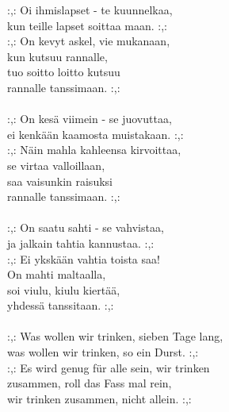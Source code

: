 
            :,: Oi ihmislapset - te kuunnelkaa, \\
            kun teille lapset soittaa maan. :,: \\
            :,: On kevyt askel, vie mukanaan, \\
            kun kutsuu rannalle, \\
            tuo soitto loitto kutsuu \\
            rannalle tanssimaan. :,: \\
\hspace{10mm} \\
            :,: On kesä viimein - se juovuttaa, \\
            ei kenkään kaamosta muistakaan. :,: \\
            :,: Näin mahla kahleensa kirvoittaa, \\
            se virtaa valloillaan, \\
            saa vaisunkin raisuksi \\
            rannalle tanssimaan. :,: \\
\hspace{10mm} \\
            :,: On saatu sahti - se vahvistaa, \\
            ja jalkain tahtia kannustaa. :,: \\
            :,: Ei ykskään vahtia toista saa! \\
            On mahti maltaalla, \\
            soi viulu, kiulu kiertää, \\
            yhdessä tanssitaan. :,: \\
\hspace{10mm} \\
            :,: Was wollen wir trinken, sieben Tage lang, \\
            was wollen wir trinken, so ein Durst. :,: \\
            :,: Es wird genug für alle sein, wir trinken \\
            zusammen, roll das Fass mal rein, \\
            wir trinken zusammen, nicht allein. :,: \\
